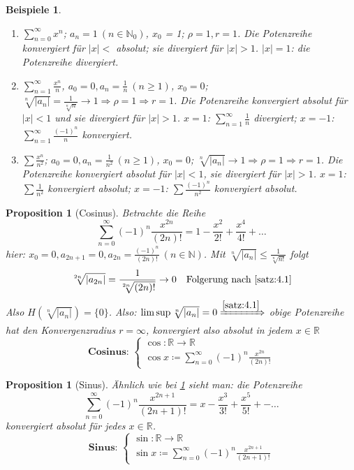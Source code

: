 \documentclass[titlepage,ngerman,a4paper,headsepline,DIV15,halfparskip*,14pt]{scrartcl}
\newcommand{\R}{\mathbb{R}}
\newcommand{\N}{\mathbb{N}}
\theoremstyle{dotless}
\newtheorem{prop}[satz]{Proposition}
\newtheorem*{beispiele}{Beispiele}
\begin{document}
\begin{beispiele} ~\
	\begin{enumerate}
		\item $\sum_{n=0}^{\infty} x^{n}$; $a_{n} = 1 ~(n \in \N_{0})$, $x_{0}$ = 1; $\rho = 1, r = 1$. Die Potenzreihe konvergiert für $|x| <$ absolut; sie divergiert für $|x| > 1$. $|x| = 1$: die Potenzreihe divergiert.
		\item $\sum_{n=1}^{\infty} \frac{x^{n}}{n}$, $a_{0} = 0, a_{n} = \frac{1}{n} ~(n \geq 1)$, $x_{0} = 0$; $\sqrt[n]{|a_{n}|} = \frac{1}{\sqrt[n]{n}} \rightarrow 1 \Rightarrow \rho = 1 \Rightarrow r = 1$. Die Potenzreihe konvergiert absolut für $|x| < 1$ und sie divergiert für $|x| > 1$. $x = 1$: $\sum_{n=1}^{\infty} \frac{1}{n}$ divergiert; $x = -1$: $\sum_{n=1}^{\infty} \frac{(-1)^{n}}{n}$ konvergiert.
		\item $\sum \frac{x^{n}}{n^{2}}$; $a_{0} = 0, a_{n} = \frac{1}{n^{2}} ~(n \geq 1)$, $x_{0} = 0$; $\sqrt[n]{|a_{n}|} \rightarrow 1 \Rightarrow \rho = 1 \Rightarrow r = 1$. Die Potenzreihe konvergiert absolut für $|x|< 1$, sie divergiert für $|x| > 1$. $x = 1$: $\sum \frac{1}{n^{2}}$ konvergiert absolut; $x = -1$: $\sum \frac{(-1)^{n}}{n^{2}}$ konvergiert absolut.
	\end{enumerate}	
\end{beispiele}

\begin{prop}[Cosinus] \label{prop:4.2-Cosinus}
	Betrachte die Reihe
	$$ \sum_{n=0}^{\infty} (-1)^{n} \frac{x^{2n}}{(2n)!} = 1 - \frac{x^{2}}{2!} + \frac{x^{4}}{4!} + \dotsc $$
	hier: $x_{0} = 0, a_{2n + 1} = 0, a_{2n} = \frac{(-1)^{n}}{(2n)!} ~(n \in \N)$. Mit $\sqrt[n]{|a_{n}|} \leq \frac{1}{\sqrt[n]{n!}}$ folgt
	$$ \sqrt[2n]{|a_{2n}|} = \frac{1}{\sqrt[2n]{(2n)!}} \rightarrow 0 \quad \text{Folgerung nach } \ref{satz:4.1} $$ 
	Also $H(\sqrt[n]{|a_{n}|}) = \{ 0 \}$. Also: $\limsup \sqrt[n]{|a_{n}|} = 0 \xRightarrow[]{\ref{satz:4.1}}$ obige Potenzreihe hat den Konvergenzradius $r = \infty$, konvergiert also absolut in jedem $x \in \R$
	$$ \textbf{Cosinus: } \begin{cases} \cos \colon \R \rightarrow \R \\ \cos x \coloneqq \sum_{n=0}^{\infty} (-1)^{n} \frac{x^{2n}}{(2n)!} \end{cases} $$
\end{prop}

\begin{prop}[Sinus] \label{prop:4.3-Sinus}
	Ähnlich wie bei \ref{prop:4.2-Cosinus} sieht man: die Potenzreihe 
	$$ \sum_{n=0}^{\infty} (-1)^{n} \frac{x^{2n+1}}{(2n+1)!} = x - \frac{x^{3}}{3!} + \frac{x^{5}}{5!} +- \dotsc $$
	konvergiert absolut für jedes $x \in \R$.
	$$ \textbf{Sinus: } \begin{cases} \sin \colon \R \rightarrow \R \\ \sin x \coloneqq \sum_{n=0}^{\infty} (-1)^{n} \frac{x^{2n+1}}{(2n+1)!} \end{cases} $$	
\end{prop}
\end{document}
